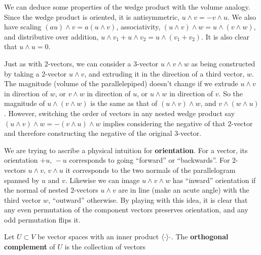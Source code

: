 We can deduce some properties of the wedge product with the volume analogy. Since the wedge product is oriented, it is antisymmetric, $u \wedge v = - v \wedge u$. We also have scaling $(au)\wedge v = a (u \wedge v)$, associativity, $(u \wedge v) \wedge w = u \wedge (v \wedge w)$, and distributive over addition, $u \wedge v_1 + u \wedge v_2 = u \wedge (v_1 + v_2)$. It is also clear that $u \wedge u = 0$.

Just as with $2$-vectors, we can consider a $3$-vector $u \wedge v \wedge w$ as being constructed by taking a $2$-vector $u\wedge v$, and extruding it in the direction of a third vector, $w$. The magnitude (volume of the parallelepiped) doesn't change if we extrude $u \wedge v$ in direction of $w$, or $v \wedge w$ in direction of $u$, or $u \wedge w$ in direction of $v$. So the magnitude of $u \wedge (v \wedge w)$ is the same as that of $(u \wedge v) \wedge w$, and $v \wedge (w \wedge u)$. However, switching the order of vectors in any nested wedge product say $(u \wedge v) \wedge w = - (v \wedge u) \wedge w$ implies considering the negative of that $2$-vector and therefore constructing the negative of the original $3$-vector.

We are trying to ascribe a physical intuition for \textbf{orientation}. For a vector, its orientation $+u,\, -u$ corresponds to going ``forward'' or ``backwards''. For $2$-vectors $u\wedge v, \, v \wedge u$ it corresponds to the two normals of the parallelogram spanned by $u$ and $v$. Likewise we can image $u \wedge v \wedge w$ has ``inward'' orientation if the normal of nested $2$-vectors $u \wedge v$ are in line (make an acute angle) with the third vector $w$,  ``outward'' otherwise. By playing with this idea, it is clear that any even permutation of the component vectors preserves orientation, and any odd permutation flips it.

\begin{definition}
    Let $U\subset V$ be vector spaces with an inner product $\langle \cdot \rangle{\cdot}$. The \textbf{orthogonal complement} of $U$ is the collection of vectors
\end{definition}

